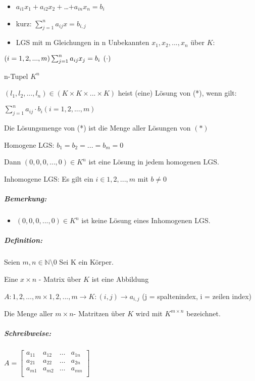 \documentclass{../tudscript}
\begin{document}
\begin{itemize}
\item
  \(a_{i1}x_1+a_{i2}x_2+\)\ldots{}\(+a_{in}x_n= b_i\)
\item
  kurz: \(\sum_ {j=1}^n a_{ij}x = b_{i,j}\)
\item
  LGS mit m Gleichungen in n Unbekannten \(x_1, x_2,...,x_n\) über
  \(K\):
\end{itemize}

\((i=1,2,...,m) \sum_ {j=1}^n a_{ij}x_j = b_i \:\:(\cdot)\)

n-Tupel \(K^n\)

\((l_1,l_2,...,l_n)\in (K\times K\times ...\times K)\) heist (eine)
Lösung von (*), wenn gilt:

\(\sum_ {j=1}^n a_{ij} \cdot b_i (i=1,2,...,m)\)

Die Lösungsmenge von (*) ist die Menge aller Lösungen von \((*)\)

\hypertarget{homogene-und-inhomogene-lgs}{%
\label{homogene-und-inhomogene-lgs}}

Homogene LGS: \(b_1 = b_2 =...=b_m = 0\)

Dann \((0,0,0,...,0)\in K^n\) ist eine Lösung in jedem homogenen LGS.

Inhomogene LGS: Es gilt ein \(i \in {1,2,...,m}\) mit \(b \neq 0\)

\hypertarget{bemerkung}{%
\subparagraph{Bemerkung:}\label{bemerkung}}

\begin{itemize}
\tightlist
\item
  \((0,0,0,...,0) \in K^n\) ist keine Lösung eines Inhomogenen LGS.
\end{itemize}

\hypertarget{definition}{%
\subparagraph{Definition:}\label{definition}}

Seien \(m,n \in \mathbb{N}\setminus {0}\) Sei K ein Körper.

Eine \(x\times n\) - Matrix über \(K\) ist eine Abbildung

\(A : {1,2,...,m} \times {1,2,...,m}\rightarrow K:(i,j)\rightarrow a_{i,j}\)
(j = spaltenindex, i = zeilen index)

Die Menge aller \(m \times n\)- Matritzen über \(K\) wird mit
\(K ^{m \times n}\) bezeichnet.

\hypertarget{schreibweise}{%
\subparagraph{Schreibweise:}\label{schreibweise}}

\(A = \begin{bmatrix}  a_{11} & a_{12} & \dots & a_{1n} \\  a_{21} & a_{22} & \dots & a_{2n} \\  a_{m1} & a_{m2} & \dots & a_{mn}\\ \end{bmatrix}\)
\end{document}
